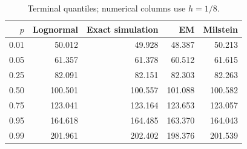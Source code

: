 \begin{table}[H]\centering\small
\caption{Terminal quantiles; numerical columns use $h=1/8$.}
\label{tab:gbm-quantile}
\begin{tabular}{rrrrr}\toprule
$p$ & Lognormal & Exact simulation & EM & Milstein\\\midrule
0.01 & 50.012 & 49.928 & 48.387 & 50.213\\
0.05 & 61.357 & 61.378 & 60.512 & 61.615\\
0.25 & 82.091 & 82.151 & 82.303 & 82.263\\
0.50 & 100.501 & 100.557 & 101.088 & 100.582\\
0.75 & 123.041 & 123.164 & 123.653 & 123.057\\
0.95 & 164.618 & 164.485 & 163.370 & 164.043\\
0.99 & 201.961 & 202.402 & 198.376 & 201.539\\
\bottomrule\end{tabular}
\end{table}

